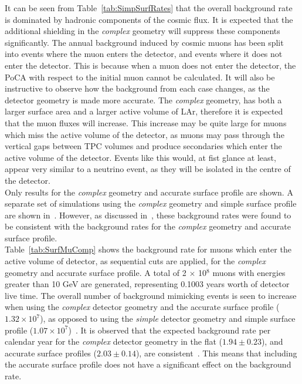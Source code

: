 It can be seen from Table~\ref{tab:SimpSurfRates} that the overall background rate is dominated by hadronic components of the cosmic flux. It is expected that the additional shielding in the \emph{complex} geometry will suppress these components significantly. The annual background induced by cosmic muons has been split into events where the muon enters the detector, and events where it does not enter the detector. This is because when a muon does not enter the detector, the PoCA with respect to the initial muon cannot be calculated. It will also be instructive to observe how the background from each case changes, as the detector geometry is made more accurate. The \emph{complex} geometry, has both a larger surface area and a larger active volume of LAr, therefore it is expected that the muon fluxes will increase. This increase may be quite large for muons which miss the active volume of the detector, as muons may pass through the vertical gaps between TPC volumes and produce secondaries which enter the active volume of the detector. Events like this would, at fist glance at least, appear very similar to a neutrino event, as they will be isolated in the centre of the detector. \\

Only results for the \emph{complex} geometry and accurate surface profile are shown. A separate set of simulations using the \emph{complex} geometry and simple surface profile are shown in~\citep{MartinsThesis}. However, as discussed in~\citep{MartinsThesis}, these background rates were found to be consistent with the background rates for the \emph{complex} geometry and accurate surface profile. \\

Table~\ref{tab:SurfMuComp} shows the background rate for muons which enter the active volume of detector, as sequential cuts are applied, for the \emph{complex} geometry and accurate surface profile. A total of 2 $\times$ 10$^8$ muons with energies greater than 10 GeV are generated, representing 0.1003 years worth of detector live time. The overall number of background mimicking events is seen to increase when using the \emph{complex} detector geometry and the accurate surface profile ($1.32\times10^7$), as opposed to using the \emph{simple} detector geometry and simple surface profile ($1.07\times10^7$)~\citep{MartinsThesis}. It is observed that the expected background rate per calendar year for the \emph{complex} detector geometry in the flat ($1.94\pm0.23$), and accurate surface profiles ($2.03\pm0.14$), are consistent~\citep{MartinsThesis}. This means that including the accurate surface profile does not have a significant effect on the background rate. \\

